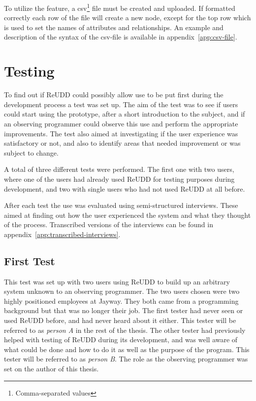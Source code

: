 \documentclass[a4paper]{report}
\begin{document}
To utilize the feature, a csv\footnote{Comma-separated values} file must be created and uploaded. If formatted correctly each row of the file will create a new node, except for the top row which is used to set the names of attributes and relationships. An example and description of the syntax of the csv-file is available in appendix~\ref{app:csv-file}.

\section{Testing}
To find out if ReUDD could possibly allow use to be put first during the development process a test was set up. The aim of the test was to see if users could start using the prototype, after a short introduction to the subject, and if an observing programmer could observe this use and perform the appropriate improvements. The test also aimed at investigating if the user experience was satisfactory or not, and also to identify areas that needed improvement or was subject to change.

A total of three different tests were performed. The first one with two users, where one of the users had already used ReUDD for testing purposes during development, and two with single users who had not used ReUDD at all before.

After each test the use was evaluated using semi-structured interviews. These aimed at finding out how the user experienced the system and what they thought of the process. Transcribed versions of the interviews can be found in appendix~\ref{app:transcribed-interviews}.

\subsection{First Test}
This test was set up with two users using ReUDD to build up an arbitrary system unknown to an observing programmer. The two users chosen were two highly positioned employees at Jayway. They both came from a programming background but that was no longer their job. The first tester had never seen or used ReUDD before, and had never heard about it either. This tester will be referred to as \emph{person A} in the rest of the thesis. The other tester had previously helped with testing of ReUDD during its development, and was well aware of what could be done and how to do it as well as the purpose of the program. This tester will be referred to as \emph{person B}. The role as the observing programmer was set on the author of this thesis.
\end{document}
